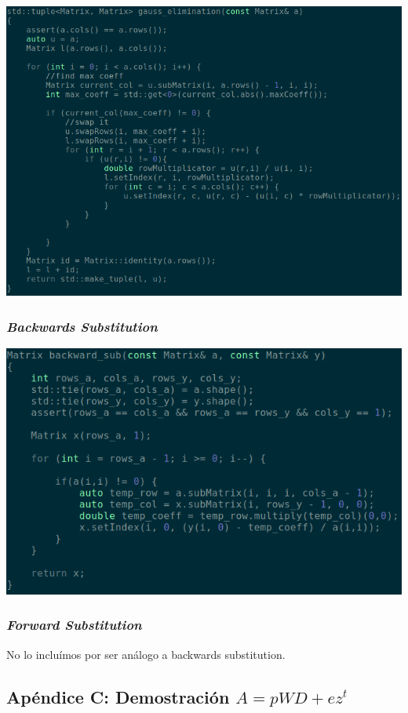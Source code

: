 			\includegraphics[scale=0.6]{img/src/gaussian_elimination}


		\subsubsection{\textit{Backwards Substitution}}

			\includegraphics[scale=0.75]{img/src/backwards_substitution}


		\subsubsection{\textit{Forward Substitution}}

			No lo incluímos por ser análogo a backwards substitution. \\


	\subsection{Apéndice C: Demostración $A = pWD + ez^{t}$}


